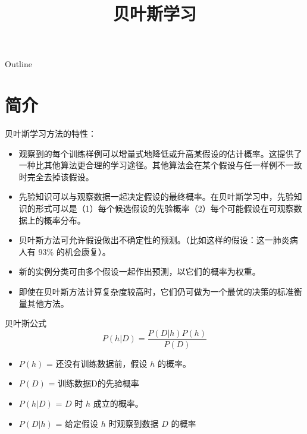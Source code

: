 \documentclass[presentation]{beamer}
\date{}
\title{贝叶斯学习}
\begin{document}
\maketitle
\begin{frame}{Outline}
\tableofcontents
\end{frame}







\section{简介}
\label{sec:org411e52f}

\begin{frame}[label={sec:orgdfc2404}]{贝叶斯学习方法的特性：}
\begin{itemize}
\item 观察到的每个训练样例可以增量式地降低或升高某假设的估计概率。这提供了一种比其他算法更合理的学习途径。其他算法会在某个假设与任一样例不一致时完全去掉该假设。
\item 先验知识可以与观察数据一起决定假设的最终概率。在贝叶斯学习中，先验知识的形式可以是（1）每个候选假设的先验概率（2）每个可能假设在可观察数据上的概率分布。
\item 贝叶斯方法可允许假设做出不确定性的预测。（比如这样的假设：这一肺炎病人有 93\% 的机会康复）。
\item 新的实例分类可由多个假设一起作出预测，以它们的概率为权重。
\item 即使在贝叶斯方法计算复杂度较高时，它们仍可做为一个最优的决策的标准衡量其他方法。
\end{itemize}
\end{frame}

\begin{frame}[label={sec:orgd34956e}]{贝叶斯公式}
\[ P(h|D) = \frac{P(D|h) P(h)}{P(D)} \]


\begin{itemize}
\item \(P(h)\) = 还没有训练数据前，假设 \(h\) 的概率。
\item \(P(D)\) = 训练数据D的先验概率
\item \(P(h|D)\) = \(D\) 时 \(h\) 成立的概率。
\item \(P(D|h)\) = 给定假设 \(h\) 时观察到数据 \(D\) 的概率
\end{itemize}
\end{frame}
\end{document}
